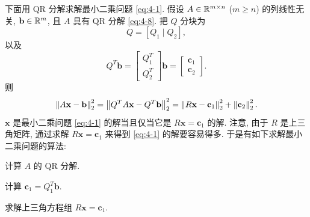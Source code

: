 下面用 QR 分解求解最小二乘问题 \eqref{eq:4-1}. 假设 $A\in\mathbb{R}^{m\times n}$ ($m\geqslant n$) 的列线性无关, $\mathbf{b}\in\mathbb{R}^m$, 且 $A$ 具有 QR 分解 \eqref{eq:4-8}. 把 $Q$ 分块为
\[
  Q=[Q_1\mid Q_2],
\]
以及
\[
  Q^T\mathbf{b}=
  \begin{bmatrix}
    Q_1^T\\
    Q_2^T
  \end{bmatrix}\mathbf{b}
  =
  \begin{bmatrix}
    \mathbf{c}_1\\
    \mathbf{c}_2
  \end{bmatrix}.
\]
则
\[
  \left\|A\mathbf{x}-\mathbf{b}\right\|_2^2
  =\left\|Q^TA\mathbf{x}-Q^T\mathbf{b}\right\|_2^2
  =\left\|R\mathbf{x}-\mathbf{c}_1\right\|_2^2+\left\|\mathbf{c}_2\right\|_2^2.
\]
$\mathbf{x}$ 是最小二乘问题 \eqref{eq:4-1} 的解当且仅当它是 $R\mathbf{x}=\mathbf{c}_1$ 的解. 注意, 由于 $R$ 是上三角矩阵, 通过求解 $R\mathbf{x}=\mathbf{c}_1$ 来得到 \eqref{eq:4-1} 的解要容易得多. 于是有如下求解最小二乘问题的算法:
\begin{parenlist}
  \item 计算 $A$ 的 QR 分解.
  \item 计算 $\mathbf{c}_1=Q_1^T\mathbf{b}$.
  \item 求解上三角方程组 $R\mathbf{x}=\mathbf{c}_1$.
\end{parenlist}

